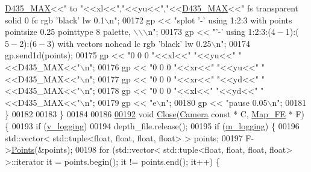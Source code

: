 \begin{DoxyCode}
{      \hyperlink{Camera_8hpp_a525f4d6ba7971b5fc8f0bc55ea826762}{D435\_MAX}<<\textcolor{stringliteral}{" to "}<<xl<<\textcolor{stringliteral}{","}<<yu<<\textcolor{stringliteral}{","}<<\hyperlink{Camera_8hpp_a525f4d6ba7971b5fc8f0bc55ea826762}{D435\_MAX}<<\textcolor{stringliteral}{" fs transparent solid 0 fc rgb 'black' lw
       0.1\(\backslash\)n"};
00172             gp << \textcolor{stringliteral}{"splot '-' using 1:2:3 with points pointsize 0.25 pointtype 8 palette, \(\backslash\)\(\backslash\)\(\backslash\)n"};
00173             gp << \textcolor{stringliteral}{"'-' using 1:2:3:($4-$1):($5-$2):($6-$3) with vectors nohead lc rgb 'black' lw 0.25\(\backslash\)n"};
00174             gp.send1d(points);
00175             gp << \textcolor{stringliteral}{"0 0 0 "}<<xl<<\textcolor{stringliteral}{" "}<<yu<<\textcolor{stringliteral}{" "}<<D435\_MAX<<\textcolor{stringliteral}{"\(\backslash\)n"};
00176             gp << \textcolor{stringliteral}{"0 0 0 "}<<xr<<\textcolor{stringliteral}{" "}<<yu<<\textcolor{stringliteral}{" "}<<D435\_MAX<<\textcolor{stringliteral}{"\(\backslash\)n"};
00177             gp << \textcolor{stringliteral}{"0 0 0 "}<<xr<<\textcolor{stringliteral}{" "}<<yd<<\textcolor{stringliteral}{" "}<<D435\_MAX<<\textcolor{stringliteral}{"\(\backslash\)n"};
00178             gp << \textcolor{stringliteral}{"0 0 0 "}<<xl<<\textcolor{stringliteral}{" "}<<yd<<\textcolor{stringliteral}{" "}<<D435\_MAX<<\textcolor{stringliteral}{"\(\backslash\)n"};
00179             gp << \textcolor{stringliteral}{"e\(\backslash\)n"};
00180             gp << \textcolor{stringliteral}{"pause 0.05\(\backslash\)n"};
00181         \}
00182 
00183     \}
00184 
00186 
\hypertarget{Logging_8hpp_source.tex_l00192}{}\hyperlink{classLogger_a6b670ceb54a249eb83da08a1914d2be8}{00192}     \textcolor{keywordtype}{void} \hyperlink{classLogger_a6b670ceb54a249eb83da08a1914d2be8}{Close}(\hyperlink{classCamera}{Camera} \textcolor{keyword}{const} * C, \hyperlink{classMap__FE}{Map\_FE} * F) \{
00193         \textcolor{keywordflow}{if} (\hyperlink{Logging_8hpp_adaf32a6a0736e8e3da49a3c2b0705fa7}{v\_logging})
00194             depth\_file.release();
00195         \textcolor{keywordflow}{if} (\hyperlink{Logging_8hpp_a3beae9ccc576e738591191c70cf26623}{m\_logging}) \{
00196             std::vector< std::tuple<float, float, float, float> > points;
00197             F->\hyperlink{classMap__FE_aedfee41631a7287c9eb377ccb05317d6}{Points}(&points);
00198             \textcolor{keywordflow}{for} (std::vector< std::tuple<float, float, float, float> >::iterator it = points.begin(); it !=
       points.end(); it++) \{
}
\end{DoxyCode}
